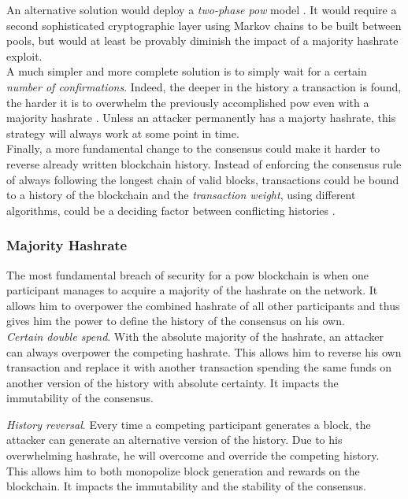 \documentclass[12pt,a4paper]{article}
\begin{document}
An alternative solution would deploy a \textit{two-phase \acrshort{pow}} model \cite{twophase}. It would require a second sophisticated cryptographic layer using Markov chains to be built between \glspl{pool}, but would at least be provably diminish the impact of a majority \gls{hashrate} exploit.\\

A much simpler and more complete solution is to simply wait for a certain \textit{number of confirmations}. Indeed, the deeper in the history a \gls{transaction} is found, the harder it is to overwhelm the previously accomplished \acrshort{pow} even with a majority \gls{hashrate} \cite{double}. Unless an attacker permanently has a majorty hashrate, this strategy will always work at some point in time.\\

Finally, a more fundamental change to the \gls{consensus} could make it harder to reverse already written blockchain history. Instead of enforcing the consensus rule of always following the longest chain of valid blocks, \glspl{transaction} could be bound to a history of the blockchain and the \textit{\gls{transaction} weight}, using different algorithms, could be a deciding factor between conflicting histories \cite{weight}.\\

\subsubsection{Majority Hashrate}

The most fundamental breach of security for a \acrshort{pow} \gls{blockchain} is when one participant manages to acquire a majority of the \gls{hashrate} on the network. It allows him to overpower the combined \gls{hashrate} of all other participants and thus gives him the power to define the history of the \gls{consensus} on his own.\\

\textit{Certain double spend}. With the absolute majority of the \gls{hashrate}, an attacker can always overpower the competing \gls{hashrate}. This allows him to reverse his own \gls{transaction} and replace it with another \gls{transaction} spending the same funds on another version of the history with absolute certainty. It impacts the immutability of the \gls{consensus}.

\textit{History reversal}. Every time a competing participant generates a block, the attacker can generate an alternative version of the history. Due to his overwhelming \gls{hashrate}, he will overcome and override the competing history. This allows him to both monopolize block generation and rewards on the \gls{blockchain}. It impacts the immutability and the stability of the \gls{consensus}.
\end{document}
